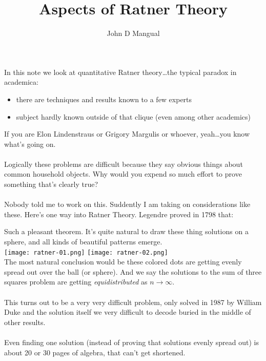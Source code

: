 \documentclass[12pt]{article}
\title{Aspects of Ratner Theory}
\author{John D Mangual}
\date{}
\begin{document}
\selectfont \fontsize{12.5}{15}\selectfont

\maketitle

\noindent In this note we look at quantitative Ratner theory\dots the typical paradox in academica:
\begin{itemize}
\item there are techniques and results known to a few experts
\item subject hardly known outside of that clique (even among other academics)
\end{itemize} 
If you are Elon Lindenstraus or Grigory Margulis or whoever, yeah\dots you know what's going on.  \\ \\
Logically these problems are difficult because they say obvious things about common household objects. Why would you expend so much effort to prove something that's clearly true? \\ \\
Nobody told me to work on this.  Suddently I am taking on considerations like these. Here's one way into Ratner Theory.  {Legendre} proved in 1798 that:
\begin{center}
\end{center}
Such a pleasant theorem.  It's quite natural to draw these thing solutions on a sphere, and all kinds of beautiful patterns emerge.  \\
\texttt{[image: ratner-01.png]}\hfill
\texttt{[image: ratner-02.png]}\\
The most natural conclusion would be these colored dots are getting evenly spread out over the ball (or sphere).  And we say the solutions to the sum of three squares problem are getting  \textit{equidistributed} as $n \to \infty$.  \\ \\
This turns out to be a very very difficult problem, only solved in 1987 by William Duke and the solution itself we very difficult to decode buried in the middle of other results.  \\ \\
Even finding one solution (instead of proving that solutions evenly spread out) is about 20 or 30 pages of algebra, that can't get shortened.
\end{document}
